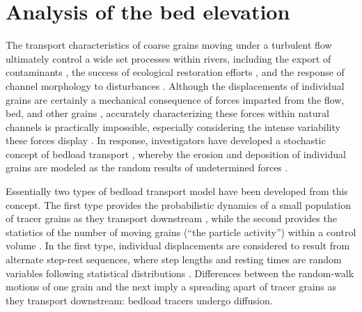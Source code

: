 
\chapter{Analysis of the bed elevation}
\label{ch:bedEle}

The transport characteristics of coarse grains moving under a turbulent flow ultimately control a wide set processes within rivers, including the export of contaminants \citep{Malmon2005,Macklin2006}, the success of ecological restoration efforts \citep{Gaeuman2017}, and the response of channel morphology to disturbances \citep{Hassan2017}.
Although the displacements of individual grains are certainly a mechanical consequence of forces imparted from the flow, bed, and other grains \citep{Wiberg1985, Vowinckel2014,Gonzalez2017}, accurately characterizing these forces within natural channels is practically impossible, especially considering the intense variability these forces display \citep{Schmeeckle2007,Celik2010, Dwivedi2011}. In response, investigators have developed a stochastic concept of bedload transport \citep{Einstein1937}, whereby the erosion and deposition of individual grains are modeled as the random results of undetermined forces \citep{Einstein1950,Paintal1971,Ancey2006}.

Essentially two types of bedload transport model have been developed from this concept. 
The first type provides the probabilistic dynamics of a small population of tracer grains as they transport downstream \citep{Einstein1937,Hubbell1964, Nakagawa1976,Martin2012,Lajeunesse2017,Wu2019}, while the second provides the statistics of the number of moving grains (``the particle activity'') within a control volume \citep{Einstein1950,Ancey2006,Ancey2008,Furbish2012a}.
In the first type, individual displacements are considered to result from alternate step-rest sequences, where step lengths and resting times are random variables following statistical distributions \citep{Einstein1937}. 
Differences between the random-walk motions of one grain and the next imply a spreading apart of tracer grains as they transport downstream: bedload tracers undergo diffusion.

